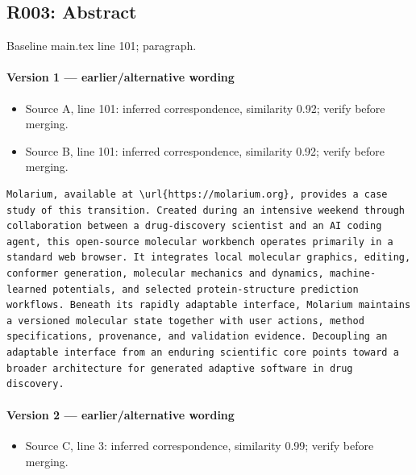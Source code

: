 \documentclass[11pt]{article}
\begin{document}
\subsection{R003: Abstract}

Baseline main.tex line 101; paragraph.

\paragraph{Version 1 --- earlier/alternative wording}

\begin{itemize}[leftmargin=*]
\item Source A, line 101: inferred correspondence, similarity 0.92; verify before merging.
\item Source B, line 101: inferred correspondence, similarity 0.92; verify before merging.
\end{itemize}

\begin{lstlisting}
Molarium, available at \url{https://molarium.org}, provides a case study of this transition. Created during an intensive weekend through collaboration between a drug-discovery scientist and an AI coding agent, this open-source molecular workbench operates primarily in a standard web browser. It integrates local molecular graphics, editing, conformer generation, molecular mechanics and dynamics, machine-learned potentials, and selected protein-structure prediction workflows. Beneath its rapidly adaptable interface, Molarium maintains a versioned molecular state together with user actions, method specifications, provenance, and validation evidence. Decoupling an adaptable interface from an enduring scientific core points toward a broader architecture for generated adaptive software in drug discovery.
\end{lstlisting}

\paragraph{Version 2 --- earlier/alternative wording}

\begin{itemize}[leftmargin=*]
\item Source C, line 3: inferred correspondence, similarity 0.99; verify before merging.
\end{itemize}
\end{document}
